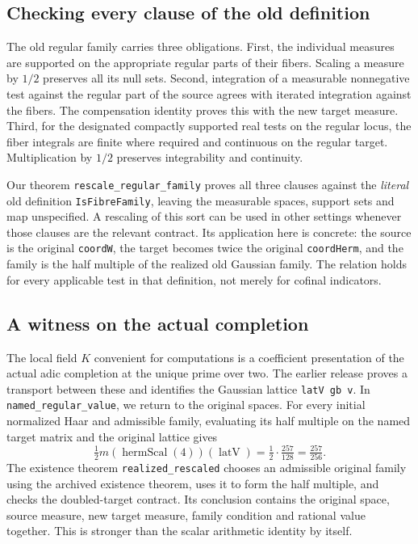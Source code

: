\documentclass[12pt,letterpaper]{article}
\newcommand{\id}[1]{{\small\nolinkurl{#1}}}
\begin{document}
\subsection{Checking every clause of the old definition}
The old regular family carries three obligations. First, the individual measures are supported on the appropriate regular parts of their fibers. Scaling a measure by $1/2$ preserves all its null sets. Second, integration of a measurable nonnegative test against the regular part of the source agrees with iterated integration against the fibers. The compensation identity proves this with the new target measure. Third, for the designated compactly supported real tests on the regular locus, the fiber integrals are finite where required and continuous on the regular target. Multiplication by $1/2$ preserves integrability and continuity.

Our theorem \id{rescale_regular_family} proves all three clauses against the \emph{literal} old definition \id{IsFibreFamily}, leaving the measurable spaces, support sets and map unspecified. A rescaling of this sort can be used in other settings whenever those clauses are the relevant contract. Its application here is concrete: the source is the original \id{coordW}, the target becomes twice the original \id{coordHerm}, and the family is the half multiple of the realized old Gaussian family. The relation holds for every applicable test in that definition, not merely for cofinal indicators.

\subsection{A witness on the actual completion}
The local field $K$ convenient for computations is a coefficient presentation of the actual adic completion at the unique prime over two. The earlier release proves a transport between these and identifies the Gaussian lattice \id{latV gb v}. In \id{named_regular_value}, we return to the original spaces. For every initial normalized Haar and admissible family, evaluating its half multiple on the named target matrix and the original lattice gives
\[
       \tfrac12 m(\operatorname{hermScal}(4))(\operatorname{latV})
       =\tfrac12\cdot\tfrac{257}{128}
       =\tfrac{257}{256}.
\]
The existence theorem \id{realized_rescaled} chooses an admissible original family using the archived existence theorem, uses it to form the half multiple, and checks the doubled-target contract. Its conclusion contains the original space, source measure, new target measure, family condition and rational value together. This is stronger than the scalar arithmetic identity by itself.
\end{document}
